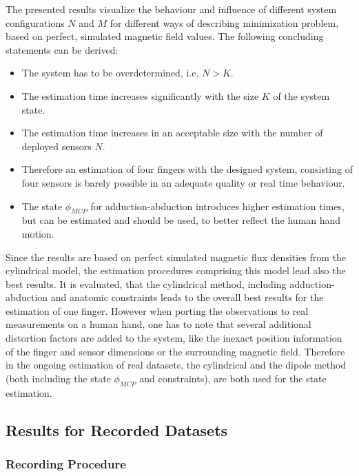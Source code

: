 The presented results visualize the behaviour and influence of different system configurations $ N $ and $ M $ for different ways of describing minimization problem, based on perfect, simulated magnetic field values. The following concluding statements can be derived:
\begin{itemize}
\item The system has to be overdetermined, i.e. $ N > K $.
\item The estimation time increases significantly with the size $ K $ of the system state.
\item The estimation time increases in an acceptable size with the number of deployed sensors $ N $.
\item Therefore an estimation of four fingers with the designed system, consisting of four sensors is barely possible in an adequate quality or real time behaviour.
\item The state $ \phi_{MCP} $ for adduction-abduction introduces higher estimation times, but can be estimated and should be used, to better reflect the human hand motion.
\end{itemize}
Since the results are based on perfect simulated magnetic flux densities from the cylindrical model, the estimation procedures comprising this model lead also the best results. It is evaluated, that the cylindrical method, including adduction-abduction and anatomic constraints leads to the overall best results for the estimation of one finger. However when porting the observations to real measurements on a human hand, one has to note that several additional distortion factors are added to the system, like the inexact position information of the finger and sensor dimensions or the surrounding magnetic field. Therefore in the ongoing estimation of real datasets, the cylindrical and the dipole method (both including the state $ \phi_{MCP} $ and constraints), are both used for the state estimation.


\subsection{Results for Recorded Datasets} \label{subsec:resMeas}

\subsubsection{Recording Procedure}\label{subsubsec:recSetup}

